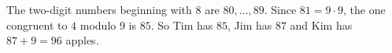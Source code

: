 The two-digit numbers beginning with $8$ are $80,\dots,89$. Since $81=9\cdot9$, the one congruent to $4$ modulo $9$ is $85$. So Tim has $85$, Jim has $87$ and Kim has $87+9=\boxed{96}$ apples.
